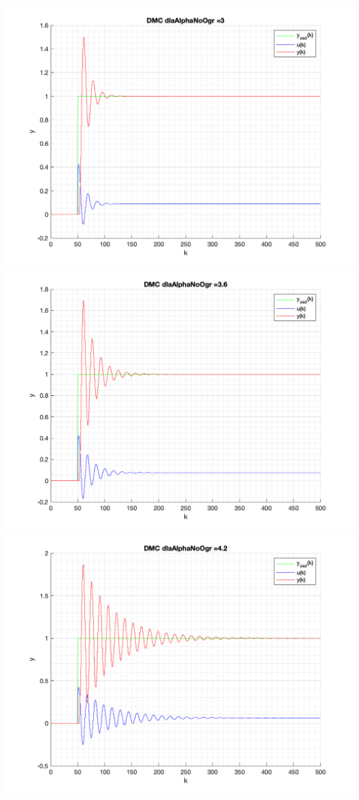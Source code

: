 \documentclass[a4paper, 11pt]{article}
\begin{document}
\begin{enumerate}
 \includegraphics[width=\linewidth]{./ModelsDodatkowe_AlphaNoOgr/P4_DMC_AlphaNoOgr_3_png.png} 
 \includegraphics[width=\linewidth]{./ModelsDodatkowe_AlphaNoOgr/P4_DMC_AlphaNoOgr_3_6_png.png} 
 \includegraphics[width=\linewidth]{./ModelsDodatkowe_AlphaNoOgr/P4_DMC_AlphaNoOgr_4_2_png.png} 

\end{enumerate}
\end{document}
